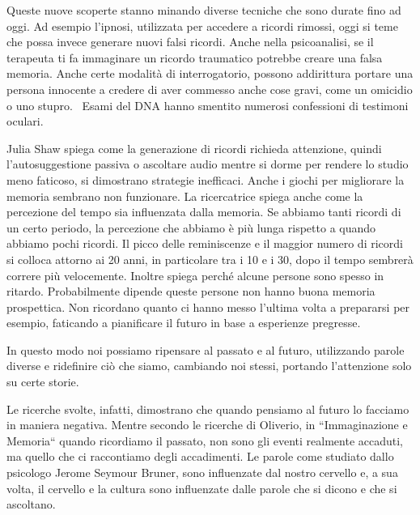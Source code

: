\documentclass[12pt]{book} %
\begin{document}
\begin{mdframed}[linewidth=1pt]
Queste nuove scoperte stanno minando diverse tecniche che sono durate fino ad oggi. Ad esempio
l'ipnosi, utilizzata per accedere a ricordi rimossi, oggi si teme che possa invece generare nuovi
falsi ricordi. Anche nella psicoanalisi, se il terapeuta ti fa immaginare un ricordo traumatico potrebbe creare una
falsa memoria. Anche certe modalità di interrogatorio, possono addirittura portare una persona innocente a credere di
aver commesso anche cose gravi, come un omicidio o uno stupro. \ Esami del DNA hanno smentito numerosi confessioni di
testimoni oculari.

Julia Shaw spiega come la generazione di ricordi richieda attenzione, quindi l'autosuggestione
passiva o ascoltare audio mentre si dorme per rendere lo studio meno faticoso, si dimostrano strategie inefficaci.
Anche i giochi per migliorare la memoria sembrano non funzionare. La ricercatrice spiega anche come la percezione del
tempo sia influenzata dalla memoria. Se abbiamo tanti ricordi di un certo periodo, la percezione che abbiamo è più
lunga rispetto a quando abbiamo pochi ricordi. Il picco delle reminiscenze e il maggior numero di ricordi si colloca
attorno ai 20 anni, in particolare tra i 10 e i 30, dopo il tempo sembrerà correre più velocemente. Inoltre spiega
perché alcune persone sono spesso in ritardo. Probabilmente dipende queste persone non hanno buona memoria prospettica.
Non ricordano quanto ci hanno messo l'ultima volta a prepararsi per esempio, faticando a pianificare il futuro in base
a esperienze pregresse.
\end{mdframed}

In questo modo noi possiamo ripensare al passato e al futuro, utilizzando parole diverse e ridefinire ciò che siamo,
cambiando noi stessi, portando l'attenzione solo su certe storie. 

Le ricerche svolte, infatti, dimostrano che quando pensiamo al futuro lo facciamo in maniera
negativa. Mentre secondo le ricerche di Oliverio, in
“Immaginazione e Memoria“ quando ricordiamo il passato, non sono gli eventi
realmente accaduti, ma quello che ci raccontiamo degli accadimenti. Le parole come studiato dallo psicologo Jerome
Seymour Bruner, sono influenzate dal nostro cervello e, a sua volta, il cervello e la cultura sono influenzate dalle
parole che si dicono e che si
ascoltano.
\end{document}
